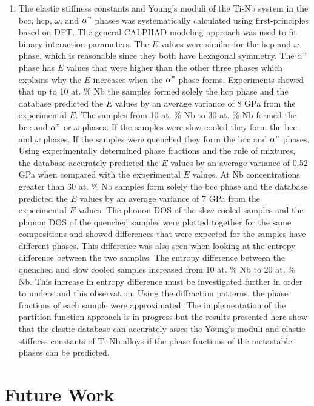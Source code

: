 \begin{enumerate}
	\item The elastic stiffness constants and Young's moduli of the Ti-Nb system in the bcc, hcp, $\omega$, and $\alpha"$ phases was systematically calculated using first-principles based on DFT. The general CALPHAD modeling approach was used to fit binary interaction parameters. The $E$ values were similar for the hcp and $\omega$ phase, which is reasonable since they both have hexagonal symmetry. The $\alpha"$ phase has $E$ values that were higher than the other three phases which explains why the $E$ increases when the $\alpha"$ phase forms. Experiments showed that up to 10 at. \% Nb the samples formed solely the hcp phase and the database predicted the $E$ values by an average variance of 8 GPa from the experimental $E$. The samples from 10 at. \% Nb to 30 at. \% Nb formed the bcc and $\alpha"$ or $\omega$ phases. If the samples were slow cooled they form the bcc and $\omega$ phases. If the samples were quenched they form the bcc and $\alpha"$ phases. Using experimentally determined phase fractions and the rule of mixtures, the database accurately predicted the $E$ values by an average variance of 0.52 GPa when compared with the experimental $E$ values. At Nb concentrations greater than 30 at. \% Nb samples form solely the bcc phase and the database predicted the $E$ values by an average variance of 7 GPa from the experimental $E$ values. The phonon DOS of the slow cooled samples and the phonon DOS of the quenched samples were plotted together for the same compositions and showed differences that were expected for the samples have different phases. This difference was also seen when looking at the entropy difference between the two samples. The entropy difference between the quenched and slow cooled samples increased from 10 at. \% Nb to 20 at. \% Nb. This increase in entropy difference must be investigated further in order to understand this observation. Using the diffraction patterns, the phase fractions of each sample were approximated. The implementation of the partition function approach is in progress but the results presented here show that the elastic database can accurately asses the Young's moduli and elastic stiffness constants of Ti-Nb alloys if the phase fractions of the metastable phases can be predicted.
\end{enumerate}

\section{Future Work}

